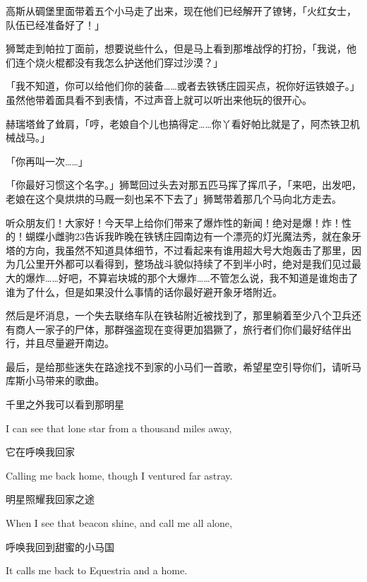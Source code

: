 高斯从碉堡里面带着五个小马走了出来，现在他们已经解开了镣铐，「火红女士，队伍已经准备好了！」

狮鹫走到帕拉丁面前，想要说些什么，但是马上看到那堆战俘的打扮，「我说，他们连个烧火棍都没有我怎么护送他们穿过沙漠？」

「我不知道，你可以给他们你的装备……或者去铁锈庄园买点，祝你好运铁娘子。」虽然他带着面具看不到表情，不过声音上就可以听出来他玩的很开心。

赫瑞塔耸了耸肩，「哼，老娘自个儿也搞得定……你丫看好帕比就是了，阿杰铁卫机械战马。」

「你再叫一次……」

「你最好习惯这个名字。」狮鹫回过头去对那五匹马挥了挥爪子，「来吧，出发吧，老娘在这个臭烘烘的马厩一刻也呆不下去了」狮鹫带着那几个马向北方走去。

\horizonline

{\rt 听众朋友们！大家好！今天早上给你们带来了爆炸性的新闻！绝对是爆！炸！性的！蝴蝶小雌驹23告诉我昨晚在铁锈庄园南边有一个漂亮的灯光魔法秀，就在象牙塔的方向，我虽然不知道具体细节，不过看起来有谁用超大号大炮轰击了那里，因为几公里开外都可以看得到，整场战斗貌似持续了不到半小时，绝对是我们见过最大的爆炸……好吧，不算岩块城的那个大爆炸……不管怎么说，我不知道是谁炮击了谁为了什么，但是如果没什么事情的话你最好避开象牙塔附近。

然后是坏消息，一个失去联络车队在铁毡附近被找到了，那里躺着至少八个卫兵还有商人一家子的尸体，那群强盗现在变得更加猖獗了，旅行者们你们最好结伴出行，并且尽量避开南边。

最后，是给那些迷失在路途找不到家的小马们一首歌，希望星空引导你们，请听马库斯小马带来的歌曲。}


\begin{song}
    千里之外我可以看到那明星
    
    I can see that lone star from a thousand miles away,
    
    \medskip

    它在呼唤我回家
    
    Calling me back home, though I ventured far astray.
    
    \medskip

    明星照耀我回家之途
    
    When I see that beacon shine, and call me all alone,
    
    \medskip

    呼唤我回到甜蜜的小马国
    
    It calls me back to Equestria and a home.
\end{song}


